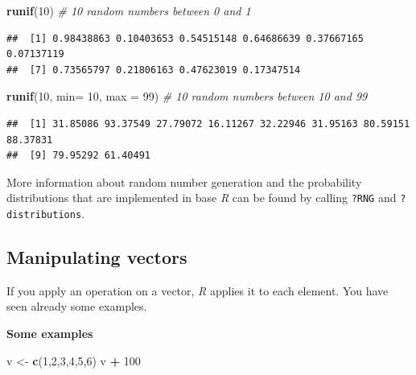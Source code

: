 \documentclass[
]{scrartcl}
\makeatletter
\newenvironment{Shaded}{\begin{snugshade}}{\end{snugshade}}
\newcommand{\AttributeTok}[1]{\textcolor[rgb]{0.13,0.29,0.53}{#1}}
\newcommand{\CommentTok}[1]{\textcolor[rgb]{0.56,0.35,0.01}{\textit{#1}}}
\newcommand{\DecValTok}[1]{\textcolor[rgb]{0.00,0.00,0.81}{#1}}
\newcommand{\FunctionTok}[1]{\textcolor[rgb]{0.13,0.29,0.53}{\textbf{#1}}}
\newcommand{\NormalTok}[1]{#1}
\newcommand{\OtherTok}[1]{\textcolor[rgb]{0.56,0.35,0.01}{#1}}
\newcommand{\SpecialCharTok}[1]{\textcolor[rgb]{0.81,0.36,0.00}{\textbf{#1}}}
\newenvironment{kframe}{%
\medskip{}
\setlength{\fboxsep}{.8em}
 \def\at@end@of@kframe{}%
 \ifinner\ifhmode%
  \def\at@end@of@kframe{\end{minipage}}%
  \begin{minipage}{\columnwidth}%
 \fi\fi%
 \def\FrameCommand##1{\hskip\@totalleftmargin \hskip-\fboxsep
 \colorbox{shadecolor}{##1}\hskip-\fboxsep
     \hskip-\linewidth \hskip-\@totalleftmargin \hskip\columnwidth}%
 \MakeFramed {\advance\hsize-\width
   \@totalleftmargin\z@ \linewidth\hsize
   \@setminipage}}%
 {\par\unskip\endMakeFramed%
 \at@end@of@kframe}
\newenvironment{rmdblock}[1]
  {
  \begin{itemize}
  \renewcommand{\labelitemi}{
    \raisebox{-.7\height}[0pt][0pt]{
      {\setkeys{Gin}{width=3em,keepaspectratio}\texttt{[image: images/\#1]}}
    }
  }
  \setlength{\fboxsep}{1em}
  \begin{kframe}
  \item
  }
  {
  \end{kframe}
  \end{itemize}
  }
\newenvironment{geek}
    {\begin{rmdblock}{geek}}
    {\end{rmdblock}}
\newenvironment{webexsolution}[1]
    {\par\tiny\textbf{#1}}
    {\par}
\newcommand{\webexhide}[1]{\begin{webexsolution}{#1}}
\makeatother
\begin{document}
\begin{Shaded}
\begin{Highlighting}[]
\FunctionTok{runif}\NormalTok{(}\DecValTok{10}\NormalTok{)                     }\CommentTok{\# 10 random numbers between 0 and 1}
\end{Highlighting}
\end{Shaded}

\begin{verbatim}
##  [1] 0.98438863 0.10403653 0.54515148 0.64686639 0.37667165 0.07137119
##  [7] 0.73565797 0.21806163 0.47623019 0.17347514
\end{verbatim}

\begin{Shaded}
\begin{Highlighting}[]
\FunctionTok{runif}\NormalTok{(}\DecValTok{10}\NormalTok{, }\AttributeTok{min=} \DecValTok{10}\NormalTok{, }\AttributeTok{max =} \DecValTok{99}\NormalTok{)  }\CommentTok{\# 10 random numbers between 10 and 99}
\end{Highlighting}
\end{Shaded}

\begin{verbatim}
##  [1] 31.85086 93.37549 27.79072 16.11267 32.22946 31.95163 80.59151 88.37831
##  [9] 79.95292 61.40491
\end{verbatim}

\begin{geek}
More information about random number generation and the probability
distributions that are implemented in base \emph{R} can be found by
calling \texttt{?RNG} and \texttt{?distributions}.
\end{geek}

\subsection{Manipulating vectors}\label{manipulating-vectors}

If you apply an operation on a vector, \emph{R} applies it to each element. You have seen already some examples.

\webexhide{Some examples}

\begin{Shaded}
\begin{Highlighting}[]
\NormalTok{v }\OtherTok{\textless{}{-}} \FunctionTok{c}\NormalTok{(}\DecValTok{1}\NormalTok{,}\DecValTok{2}\NormalTok{,}\DecValTok{3}\NormalTok{,}\DecValTok{4}\NormalTok{,}\DecValTok{5}\NormalTok{,}\DecValTok{6}\NormalTok{)}
\NormalTok{v }\SpecialCharTok{+} \DecValTok{100}
\end{Highlighting}
\end{Shaded}
\end{document}
